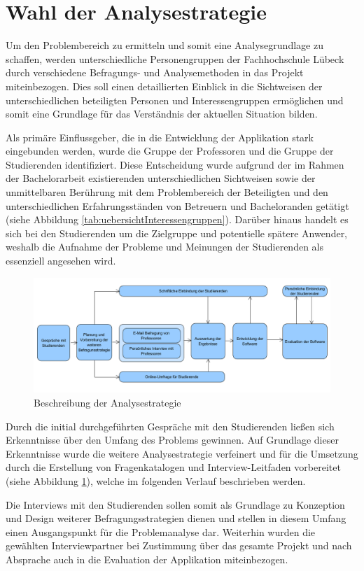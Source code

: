 \documentclass[bibliography=totoc,listof=totoc,BCOR=5mm,DIV=12,oneside]{scrbook}
\begin{document}
\newpage
\section{Wahl der Analysestrategie}
\par Um den Problembereich zu ermitteln und somit eine Analysegrundlage zu schaffen, werden unterschiedliche Personengruppen der Fachhochschule Lübeck durch verschiedene Befragungs- und Analysemethoden in das Projekt miteinbezogen. Dies soll einen detaillierten Einblick in die Sichtweisen der unterschiedlichen beteiligten Personen und Interessengruppen ermöglichen und somit eine Grundlage für das Verständnis der aktuellen Situation bilden.

\par Als primäre Einflussgeber, die in die Entwicklung der Applikation stark eingebunden werden, wurde die Gruppe der Professoren und die Gruppe der Studierenden identifiziert. Diese Entscheidung wurde aufgrund der im Rahmen der Bachelorarbeit existierenden unterschiedlichen Sichtweisen sowie der unmittelbaren Berührung mit dem Problembereich der Beteiligten und den unterschiedlichen Erfahrungsständen von Betreuern und Bacheloranden getätigt (siehe Abbildung \ref{tab:uebersichtInteressengruppen}). Darüber hinaus handelt es sich bei den Studierenden um die Zielgruppe und potentielle spätere Anwender, weshalb die Aufnahme der Probleme und Meinungen der Studierenden als essenziell angesehen wird. 

\bigskip
\begin{figure}[H]
	\centering
	\includegraphics[width=1\textwidth, keepaspectratio]{Bilder/Diagramme/Analysestrategie.png}
	\caption{Beschreibung der Analysestrategie}
	\label{img:analysestrategie}
\end{figure}

\par Durch die initial durchgeführten Gespräche mit den Studierenden ließen sich Erkenntnisse über den Umfang des Problems gewinnen. Auf Grundlage dieser Erkenntnisse wurde die weitere Analysestrategie verfeinert und für die Umsetzung durch die Erstellung von Fragenkatalogen und Interview-Leitfaden vorbereitet (siehe Abbildung \ref{img:analysestrategie}), welche im folgenden Verlauf beschrieben werden.
\par Die Interviews mit den Studierenden sollen somit als Grundlage zu Konzeption und Design weiterer Befragungsstrategien dienen und stellen in diesem Umfang einen Ausgangspunkt für die Problemanalyse dar. Weiterhin wurden die gewählten Interviewpartner bei Zustimmung über das gesamte Projekt und nach Absprache auch in die Evaluation der Applikation miteinbezogen.
\end{document}
